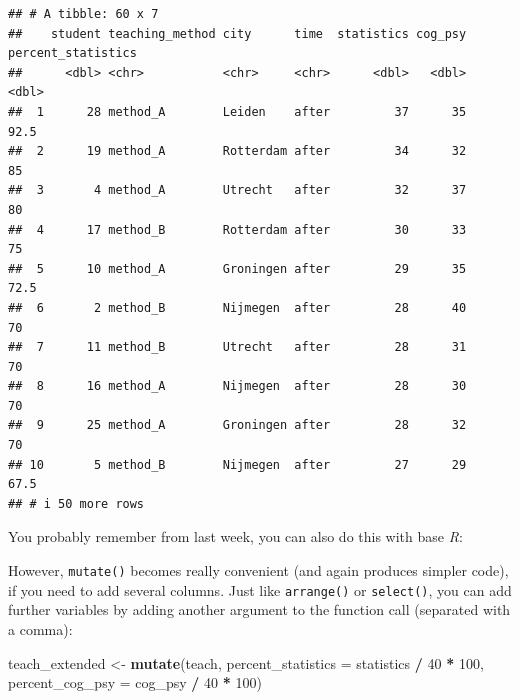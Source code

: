 \documentclass[
]{scrartcl}
\newenvironment{Shaded}{\begin{snugshade}}{\end{snugshade}}
\newcommand{\AttributeTok}[1]{\textcolor[rgb]{0.13,0.29,0.53}{#1}}
\newcommand{\DecValTok}[1]{\textcolor[rgb]{0.00,0.00,0.81}{#1}}
\newcommand{\FunctionTok}[1]{\textcolor[rgb]{0.13,0.29,0.53}{\textbf{#1}}}
\newcommand{\NormalTok}[1]{#1}
\newcommand{\OtherTok}[1]{\textcolor[rgb]{0.56,0.35,0.01}{#1}}
\newcommand{\SpecialCharTok}[1]{\textcolor[rgb]{0.81,0.36,0.00}{\textbf{#1}}}
\begin{document}
\begin{verbatim}
## # A tibble: 60 x 7
##    student teaching_method city      time  statistics cog_psy percent_statistics
##      <dbl> <chr>           <chr>     <chr>      <dbl>   <dbl>              <dbl>
##  1      28 method_A        Leiden    after         37      35               92.5
##  2      19 method_A        Rotterdam after         34      32               85  
##  3       4 method_A        Utrecht   after         32      37               80  
##  4      17 method_B        Rotterdam after         30      33               75  
##  5      10 method_A        Groningen after         29      35               72.5
##  6       2 method_B        Nijmegen  after         28      40               70  
##  7      11 method_B        Utrecht   after         28      31               70  
##  8      16 method_A        Nijmegen  after         28      30               70  
##  9      25 method_A        Groningen after         28      32               70  
## 10       5 method_B        Nijmegen  after         27      29               67.5
## # i 50 more rows
\end{verbatim}

You probably remember from last week, you can also do this with base \emph{R}:

\begin{Shaded}
\end{Shaded}

However, \texttt{mutate()} becomes really convenient (and again produces simpler code), if you need to add several columns. Just like \texttt{arrange()} or \texttt{select()}, you can add further variables by adding another argument to the function call (separated with a comma):

\begin{Shaded}
\begin{Highlighting}[]
\NormalTok{teach\_extended }\OtherTok{\textless{}{-}} \FunctionTok{mutate}\NormalTok{(teach,}
                    \AttributeTok{percent\_statistics =}\NormalTok{ statistics }\SpecialCharTok{/} \DecValTok{40} \SpecialCharTok{*} \DecValTok{100}\NormalTok{,}
                    \AttributeTok{percent\_cog\_psy =}\NormalTok{ cog\_psy }\SpecialCharTok{/} \DecValTok{40} \SpecialCharTok{*} \DecValTok{100}\NormalTok{)}
\end{Highlighting}
\end{Shaded}
\end{document}
